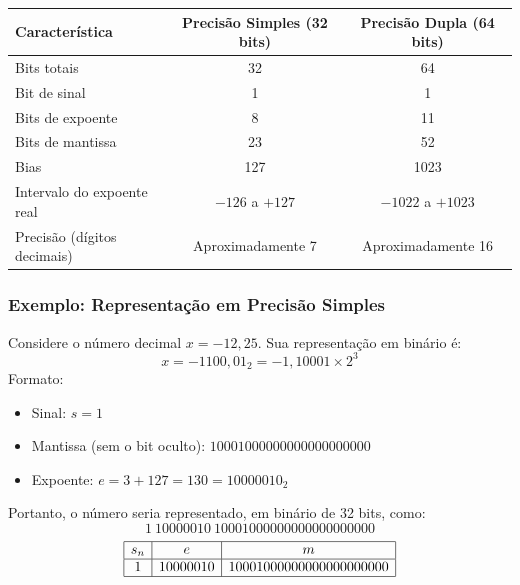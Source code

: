 \begin{center}
  \begin{tabular}{|l|c|c|}
    \hline
    \textbf{Característica}     & \textbf{Precisão Simples (32 bits)} & \textbf{Precisão Dupla (64 bits)} \\
    \hline
    Bits totais                 & 32                                  & 64                                \\
    \hline
    Bit de sinal                & 1                                   & 1                                 \\
    \hline
    Bits de expoente            & 8                                   & 11                                \\
    \hline
    Bits de mantissa            & 23                                  & 52                                \\
    \hline
    Bias                        & 127                                 & 1023                              \\
    \hline
    Intervalo do expoente real  & \(-126\) a \(+127\)                 & \(-1022\) a \(+1023\)             \\
    \hline
    Precisão (dígitos decimais) & Aproximadamente 7                   & Aproximadamente 16                \\
    \hline
  \end{tabular}
\end{center}

\subsubsection*{Exemplo: Representação em \textbf{Precisão Simples}}

Considere o número decimal \( x = -12{,}25 \). Sua representação em binário é:
\[
  x = -1100{,}01_2 = -1{,}10001 \times 2^3
\]
Formato:

\begin{itemize}
  \item Sinal: \( s = 1 \)
  \item Mantissa (sem o bit oculto): \( 10001000000000000000000 \)
  \item Expoente: \( e = 3 + 127 = 130 = 10000010_2 \)
\end{itemize}

Portanto, o número seria representado, em binário de 32 bits, como:
\[
  \boxed{1\ 10000010\ 10001000000000000000000}
\]
\[
  \begin{array}{|c|c|c|} \hline
    s_n & e        & m                       \\ \hline
    1   & 10000010 & 10001000000000000000000 \\ \hline
  \end{array}
\]
